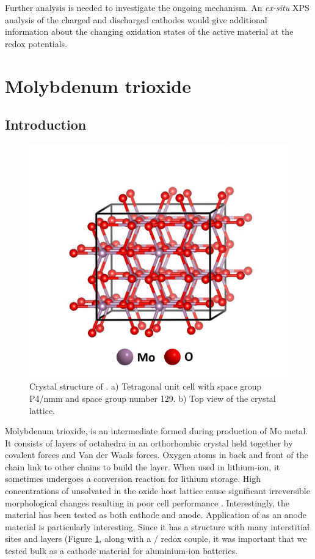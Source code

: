 Further analysis is needed to investigate the ongoing mechanism. An \textit{ex-situ} XPS analysis of the charged and discharged cathodes would give additional information about the changing oxidation states of the active material at the redox potentials.


\section{Molybdenum trioxide}

\subsection{Introduction}

 \begin{figure}[th!]
  \centering
  \includegraphics[width=\textwidth]{Figures/chap6fig/MoO3crys}
    \caption{Crystal structure of . a) Tetragonal unit cell with space group P4/nmm and space group number 129. b) Top view of the crystal lattice.}
  \label{Figures/chap6fig:MoO3crys}
\end{figure}

Molybdenum trioxide,  is an intermediate formed during production of Mo metal. It consists of layers of  octahedra in an orthorhombic crystal held together by covalent forces and Van der Waals forces. Oxygen atoms in back and front of the chain link to other chains to build the layer. When used in lithium-ion, it sometimes undergoes a conversion reaction for lithium storage. High concentrations of unsolvated  in the oxide host lattice cause significant irreversible morphological changes resulting in poor cell performance \cite{tao_moo3_2011,li_theoretical_2014}. Interestingly, the material has been tested as both cathode and anode. Application of  as an anode material is particularly interesting. Since it has a structure with many interstitial sites and layers (Figure \ref{Figures/chap6fig:MoO3crys}, along with a / redox couple, it was important that we tested bulk  as a cathode material for aluminium-ion batteries.

